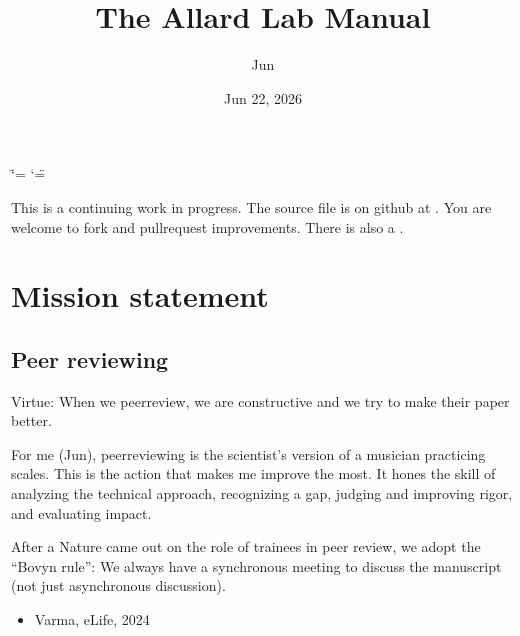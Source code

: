 \documentclass[letterpaper,10pt,english]{sphinxmanual}
\title{The Allard Lab Manual}
\date{Jun 22, 2026}
\author{Jun}
\begin{document}
\ifdefined\shorthandoff
  \ifnum\catcode`\=\string=\active\shorthandoff{=}\fi
  \ifnum\catcode`\"=\active{}\fi
\fi

\pagestyle{empty}
\sphinxmaketitle
\pagestyle{plain}
\sphinxtableofcontents
\pagestyle{normal}
\label{\detokenize{index::doc}}


\sphinxAtStartPar
This is a continuing work in progress.
The source file is on github at .
You are welcome to fork and pull\sphinxhyphen{}request improvements.
There is also a .

\sphinxstepscope


\chapter{Mission statement}
\label{\detokenize{01OurMission:mission-statement}}\label{\detokenize{01OurMission::doc}}
\sphinxstepscope


\section{Peer reviewing}
\label{\detokenize{PeerReviewing:peer-reviewing}}\label{\detokenize{PeerReviewing:id1}}\label{\detokenize{PeerReviewing::doc}}
\sphinxAtStartPar
Virtue: When we peer\sphinxhyphen{}review, we are constructive and we try to make their paper better.

\sphinxAtStartPar
For me (Jun), peer\sphinxhyphen{}reviewing is the scientist’s version of a musician practicing scales. This is the action that makes me improve the most. It hones the skill of analyzing the technical approach, recognizing a gap, judging and improving rigor, and evaluating impact.

\sphinxAtStartPar
After a Nature  came out on the role of trainees in peer review, we adopt the “Bovyn rule”: We always have a synchronous meeting to discuss the manuscript (not just asynchronous discussion).
\begin{itemize}
\item {} 
\sphinxAtStartPar
Varma,  eLife, 2024

\end{itemize}
\end{document}
